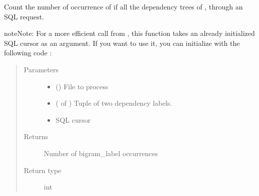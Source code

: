 \documentclass[letterpaper,10pt,english]{sphinxmanual}
\begin{document}
\begin{fulllineitems}
\label{\detokenize{analysis:loacore.analysis.frequencies.count_bigram_label}}
Count the number of occurrence of  if all the dependency trees of , through an SQL request.

\begin{sphinxadmonition}{note}{Note:}
For a more efficient call from {\hyperref[\detokenize{analysis:loacore.analysis.frequencies.bigram_label_frequencies}]{}}, this function takes an already initialized SQL
cursor as an argument.
If you want to use it, you can initialize  with the following code :

%
\begin{sphinxVerbatim}[commandchars=\\\{\}]
   
   
  
  
\end{sphinxVerbatim}
\end{sphinxadmonition}
\begin{quote}\begin{description}
\item[{Parameters}] \leavevmode\begin{itemize}
\item {} 
 () \textendash{} File to process

\item {} 
 ( of ) \textendash{} Tuple of two dependency labels.

\item {} 
 \textendash{} SQL cursor

\end{itemize}

\item[{Returns}] \leavevmode
Number of bigram\_label occurrences

\item[{Return type}] \leavevmode
int

\end{description}\end{quote}

\end{fulllineitems}
\end{document}
